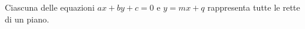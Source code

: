 Ciascuna delle equazioni \( \displaystyle {ax}+{by}+c=0\) e \( \displaystyle y={mx}+q\) rappresenta tutte le rette di un
piano. %